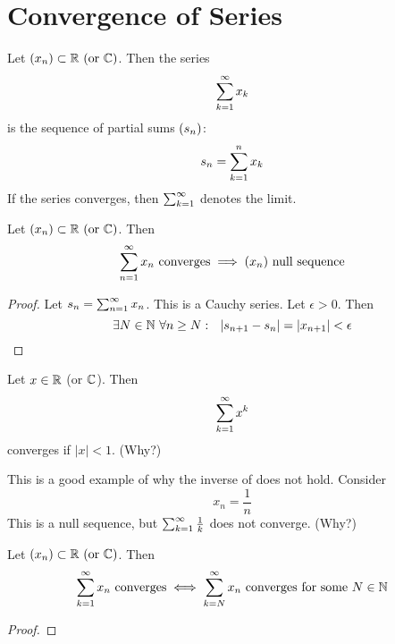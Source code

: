 \documentclass[../../script.tex]{subfiles}
\begin{document}
\section{Convergence of Series}
\begin{defi}
Let $\rcseqdef{x}$. Then the series
\[
	\series{k} x_k
\]
is the sequence of partial sums $\seq{s}$:
\[
	s_n = \series[n]{k} x_k
\]
If the series converges, then $\series{k}$ denotes the limit.
\end{defi}

\begin{thm}\label{thm:seriesnull}
Let $\rcseqdef{x}$. Then
\[
	\series{n} x_n \text{ converges} \implies \seq{x} \text{ null sequence}
\]
\end{thm}
\begin{proof}
Let $s_n = \series{n} x_n$. This is a Cauchy series. Let $\epsilon > 0$. Then
\begin{equation}
	\exists N \in \natn ~\forall n \ge N: ~~|s_{n+1} - s_n| = |x_{n+1}| < \epsilon
\end{equation}
\end{proof}

\begin{eg}
Let $x \in \realn$ (or $\cmpln$). Then
\[
	\series{k} x^k
\]
converges if $|x| < 1$. (Why?)
\end{eg}

\begin{eg}
This is a good example of why the inverse of  does not hold. Consider
\[
	x_n = \frac{1}{n}
\]
This is a null sequence, but $\series{k}\frac{1}{k}$ does not converge. (Why?)
\end{eg}

\begin{lem}
Let $\rcseqdef{x}$. Then
\[
	\series{k} x_n \text{ converges} \iff \sum_{k=N}^{\infty} x_n \text{ converges for some } N \in \natn
\]
\end{lem}
\begin{proof}
\reader
\end{proof}
\end{document}
